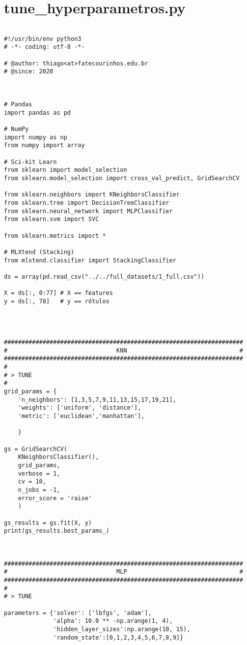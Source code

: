 \chapter{tune\_hyperparametros.py}
\begin{verbatim}
    
#!/usr/bin/env python3
# -*- coding: utf-8 -*-

# @author: thiago<at>fatecourinhos.edu.br
# @since: 2020



# Pandas
import pandas as pd

# NumPy
import numpy as np
from numpy import array

# Sci-kit Learn
from sklearn import model_selection
from sklearn.model_selection import cross_val_predict, GridSearchCV

from sklearn.neighbors import KNeighborsClassifier
from sklearn.tree import DecisionTreeClassifier
from sklearn.neural_network import MLPClassifier
from sklearn.svm import SVC

from sklearn.metrics import *

# MLXtend (Stacking)
from mlxtend.classifier import StackingClassifier

ds = array(pd.read_csv("../../full_datasets/1_full.csv"))

X = ds[:, 0:77] # X == features
y = ds[:, 78]   # y == rótulos




####################################################################
#                               KNN                                #
####################################################################
#
# > TUNE
#
grid_params = {
    'n_neighbors': [1,3,5,7,9,11,13,15,17,19,21],
    'weights': ['uniform', 'distance'],
    'metric': ['euclidean','manhattan'],

    }

gs = GridSearchCV(
    KNeighborsClassifier(),
    grid_params,
    verbose = 1,
    cv = 10,
    n_jobs = -1,
    error_score = 'raise'
    )

gs_results = gs.fit(X, y)
print(gs_results.best_params_)



####################################################################
#                               MLP                                #
####################################################################
#
# > TUNE

parameters = {'solver': ['lbfgs', 'adam'],
              'alpha': 10.0 ** -np.arange(1, 4),
              'hidden_layer_sizes':np.arange(10, 15),
              'random_state':[0,1,2,3,4,5,6,7,8,9]}


\end{verbatim}
